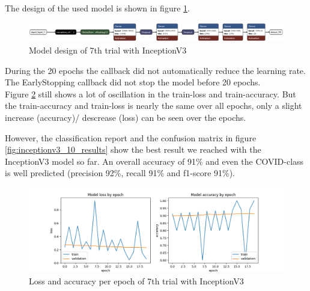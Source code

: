 \documentclass{article}
\begin{document}
The design of the used model is shown in figure \ref{fig:inceptionv3_10.keras_model_design}.
\begin{figure}%
    \centering
    \includegraphics[width=1.0\linewidth]{inceptionv3_10.keras_model_design_nice.png}
    \caption{Model design of 7th trial with InceptionV3}
    \label{fig:inceptionv3_10.keras_model_design}
\end{figure}

During the 20 epochs the callback did not automatically reduce the learning rate. The EarlyStopping callback did not stop the model before 20 epochs.\\

Figure \ref{fig:inceptionv3_10_loss_accuracy} still shows a lot of oscillation in the train-loss and train-accuracy. But the train-accuracy and train-loss is nearly the same over all epochs, only a slight increase (accuracy)/ descrease (loss) can be seen over the epochs. 

However, the classification report and the confusion matrix in figure \ref{fig:inceptionv3_10_results} show the best result we reached with the InceptionV3 model so far. An overall accuracy of 91\% and even the COVID-class is well predicted (precision 92\%, recall 91\% and f1-score 91\%).

\begin{figure}%
    \centering
    \includegraphics[width=1.0\linewidth]{inceptionv3_10_loss_accuracy.png}
    \caption{Loss and accuracy per epoch of 7th trial with InceptionV3}
    \label{fig:inceptionv3_10_loss_accuracy}
\end{figure}
\end{document}

